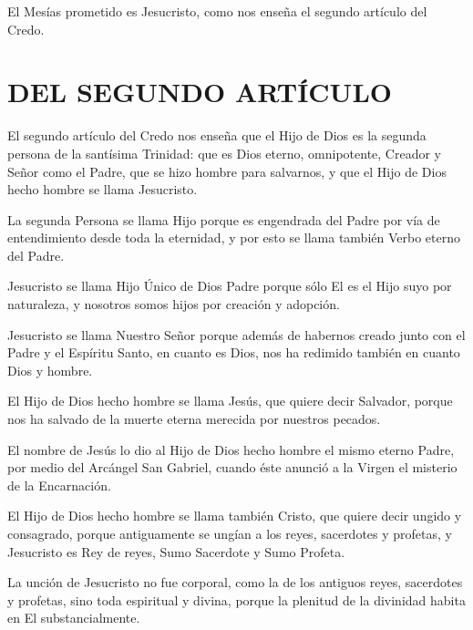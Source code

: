  El Mesías prometido es Jesucristo,
como nos enseña el segundo artículo del Credo.

\section{DEL SEGUNDO ARTÍCULO}

 El segundo artículo del Credo nos enseña que el Hijo de Dios es la segunda persona de la santísima Trinidad: que es Dios eterno, omnipotente, Creador y Señor como el Padre, que se hizo hombre para salvarnos, y que el Hijo de Dios hecho hombre se llama Jesucristo.

 La segunda Persona se
llama Hijo porque es engendrada del Padre por vía de entendimiento desde toda
la eternidad, y por esto se llama también Verbo eterno del Padre.

 Jesucristo se llama Hijo Único de Dios
Padre porque sólo El es el Hijo suyo por naturaleza, y nosotros somos hijos por
creación y adopción.

 Jesucristo se llama
Nuestro Señor porque además de habernos creado junto con el Padre y el
Espíritu Santo, en cuanto es Dios, nos ha redimido también en cuanto Dios y
hombre.

 El Hijo de
Dios hecho hombre se llama Jesús, que quiere decir Salvador, porque nos ha
salvado de la muerte eterna merecida por nuestros pecados.

 El
nombre de Jesús lo dio al Hijo de Dios hecho hombre el mismo eterno Padre, por
medio del Arcángel San Gabriel, cuando éste anunció a la Virgen el misterio de la
Encarnación.

El Hijo de Dios hecho hombre se llama también Cristo, que quiere decir ungido y
consagrado, porque antiguamente se ungían a los reyes, sacerdotes y profetas, y
Jesucristo es Rey de reyes, Sumo Sacerdote y Sumo Profeta.

 La unción de Jesucristo no fue corporal, como la de los antiguos reyes, sacerdotes y profetas, sino toda espiritual y divina, porque la plenitud de la
divinidad habita en El substancialmente.

